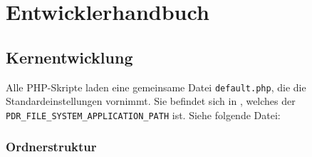 \chapter{Entwicklerhandbuch}


\section{Kernentwicklung}
Alle PHP-Skripte laden eine gemeinsame Datei \texttt{default.php}, die die
Standardeinstellungen vornimmt.
Sie befindet sich in , welches der
\texttt{PDR\_FILE\_SYSTEM\_APPLICATION\_PATH} ist.
Siehe folgende Datei:


\subsection{Ordnerstruktur}
